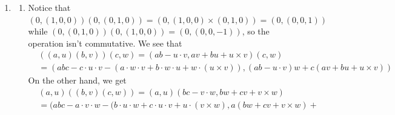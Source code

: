 \documentclass[12pt]{article}
\theoremstyle{definitionstyle}
\begin{document}
\begin{enumerate}[leftmargin=\labelsep]
		\item \begin{enumerate}
			\item Notice that $(0, (1, 0, 0))(0, (0, 1, 0)) = (0, (1, 0, 0) \times (0, 1, 0)) = (0, (0, 0, 1))$ while $(0, (0, 1, 0))(0, (1, 0, 0)) = (0, (0, 0, -1))$, so the operation isn't commutative. We see that
			\begin{align*}
				&((a, u)(b, v))(c, w) = (ab-u \cdot v, av + bu + u \times v)(c,w) \\
				&= (abc - c \cdot u \cdot v - (a \cdot w \cdot v + b \cdot w \cdot u + w \cdot (u \times v)), (ab - u\cdot v)w+c(av+bu+u \times v))
			\end{align*}
			On the other hand, we get
			\begin{align*}
				&(a, u)((b, v)(c, w)) = (a, u)(bc-v\cdot w, bw + cv + v \times w)
				\\ &= (abc - a \cdot v \cdot w - (b \cdot u \cdot w + c \cdot u \cdot v + u \cdot (v \times w), a(bw+cv+ v\times w) +
			\end{align*}
		

\end{enumerate}
\end{enumerate}
\end{document}
